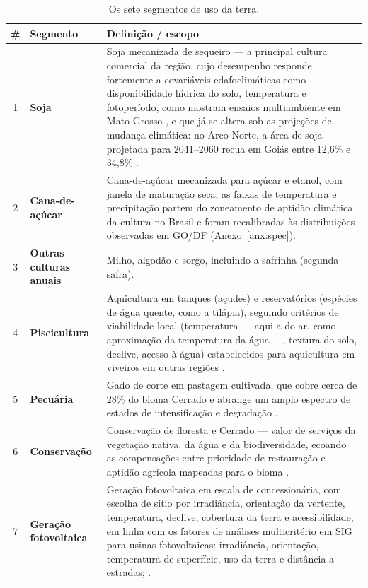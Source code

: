 \begin{table}[H]
\centering
\caption{Os sete segmentos de uso da terra.}\label{tab:segments}
\begin{tabular}{@{}clp{9.5cm}@{}}
\toprule
\# & Segmento & Definição / escopo \\
\midrule
1 & \textbf{Soja} & Soja mecanizada de sequeiro --- a principal cultura comercial da região,
  cujo desempenho responde fortemente a covariáveis edafoclimáticas como disponibilidade hídrica do
  solo, temperatura e fotoperíodo, como mostram ensaios multiambiente em Mato Grosso
  \citep[pp.~1--3]{corbellini_geographical_2024}, e que já se altera sob as projeções de mudança
  climática: no Arco Norte, a área de soja projetada para 2041--2060 recua em Goiás entre 12,6\% e
  34,8\% \citep[p.~11]{souza_climate-driven_2026}. \\
2 & \textbf{Cana-de-açúcar} & Cana-de-açúcar mecanizada para açúcar e etanol, com janela de maturação
  seca; as faixas de temperatura e precipitação partem do zoneamento de aptidão climática da cultura no
  Brasil \citep[p.~782]{aparecido_climate_2021} e foram recalibradas às distribuições observadas em
  GO/DF (Anexo~\ref{anx:spec}). \\
3 & \textbf{Outras culturas anuais} & Milho, algodão e sorgo, incluindo a safrinha (segunda-safra). \\
4 & \textbf{Piscicultura} & Aquicultura em tanques (açudes) e reservatórios (espécies de água quente,
  como a tilápia), seguindo critérios de viabilidade local (temperatura --- aqui a do ar, como
  aproximação da temperatura da água ---, textura do solo, declive, acesso à água) estabelecidos para
  aquicultura em viveiros em outras regiões \parencites{ssegane_geospatial_2012}[tab.~1]{assefa_gis_2018}. \\
5 & \textbf{Pecuária} & Gado de corte em pastagem cultivada, que cobre cerca de 28\% do bioma Cerrado
  \citep[p.~1219]{vieira_classification_2022} e abrange um amplo espectro de estados de intensificação
  e degradação \citep{vieira_classification_2022,molossi_improve_2020}. \\
6 & \textbf{Conservação} & Conservação de floresta e Cerrado --- valor de serviços da vegetação nativa,
  da água e da biodiversidade, ecoando as compensações entre prioridade de restauração e aptidão agrícola
  mapeadas para o bioma \citep{schuler_spatial_2022}. \\
7 & \textbf{Geração fotovoltaica} & Geração fotovoltaica em escala de concessionária, com escolha de
  sítio por irradiância, orientação da vertente, temperatura, declive, cobertura da terra e
  acessibilidade, em linha com os fatores de análises multicritério em SIG para usinas fotovoltaicas: 
  irradiância, orientação, temperatura de superfície, uso da terra e distância a estradas;
  \citealp[tab.~2]{rane_gis-based_2024}. \\
\bottomrule
\end{tabular}
\end{table}

